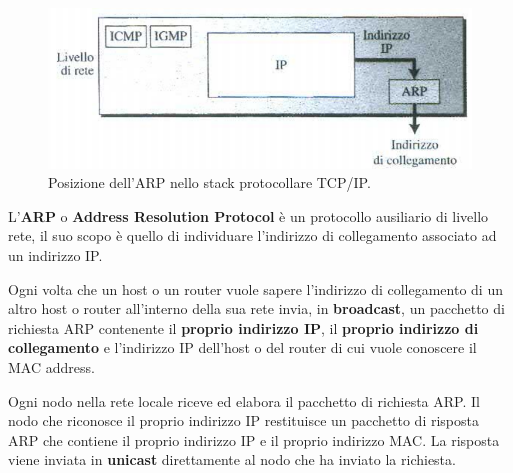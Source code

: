 \documentclass[11pt,a4paper,oneside]{book}
\theoremstyle{definition}
\begin{document}
\begin{figure}[!h]
	\includegraphics[scale=0.35]{Immagini/ARP.png}
	\centering
	\caption{Posizione dell'ARP nello stack protocollare TCP/IP.}
\end{figure}

\pagebreak

L'\textbf{ARP} o \textbf{Address Resolution Protocol} è un protocollo ausiliario di livello rete, il suo scopo è quello di individuare l'indirizzo di collegamento associato ad un indirizzo IP.

Ogni volta che un host o un router vuole sapere l'indirizzo di collegamento di un altro host o router all'interno della sua rete invia, in \textbf{broadcast}, un pacchetto di richiesta ARP contenente il \textbf{proprio indirizzo IP}, il \textbf{proprio indirizzo di collegamento} e l'indirizzo IP dell'host o del router di cui vuole conoscere il MAC address.

Ogni nodo nella rete locale riceve ed elabora il pacchetto di richiesta ARP. Il nodo che riconosce il proprio indirizzo IP restituisce un pacchetto di risposta ARP che contiene il
proprio indirizzo IP e il proprio indirizzo MAC. La risposta viene inviata in \textbf{unicast} direttamente al nodo che ha inviato la richiesta.
\end{document}
